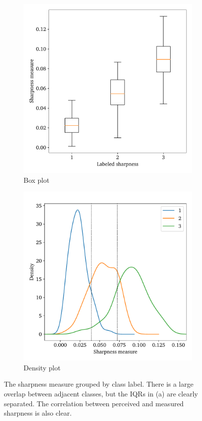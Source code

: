 \begin{figure}[htbp]
  \centering
  \begin{subfigure}[t]{0.48\textwidth}
    \centering
    \includegraphics[width=\textwidth]{figs/method/box.pdf}
    \caption{Box plot}\label{fig:sharpness-box}
\end{subfigure}%
\hfill
\begin{subfigure}[t]{0.49\textwidth}
  \centering
  \includegraphics[width=\textwidth]{figs/method/qden.pdf}
  \caption{Density plot}\label{fig:sharpness-qden}
\end{subfigure}
  \caption[Sharpness measure separability]{The sharpness measure grouped by class label.
There is a large overlap between adjacent classes, but the IQRs in (a) are clearly separated.
The correlation between perceived and measured sharpness is also clear.}\label{fig:sharpness}
\end{figure}

